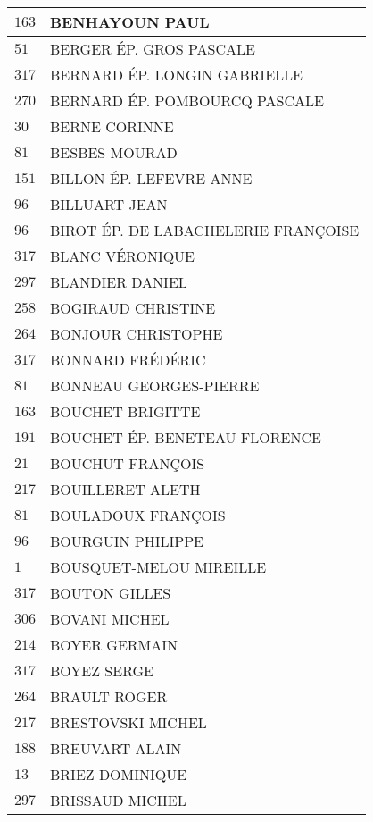\begin{xltabular}{\linewidth}{|l|X|}
    \hline
    $163$ & BENHAYOUN PAUL \\
    \hline
    $51$ & BERGER ÉP. GROS PASCALE \\
    \hline
    $317$ & BERNARD ÉP. LONGIN GABRIELLE \\
    \hline
    $270$ & BERNARD ÉP. POMBOURCQ PASCALE \\
    \hline
    $30$ & BERNE CORINNE \\
    \hline
    $81$ & BESBES MOURAD \\
    \hline
    $151$ & BILLON ÉP. LEFEVRE ANNE \\
    \hline
    $96$ & BILLUART JEAN \\
    \hline
    $96$ & BIROT ÉP. DE LABACHELERIE FRANÇOISE \\
    \hline
    $317$ & BLANC VÉRONIQUE \\
    \hline
    $297$ & BLANDIER DANIEL \\
    \hline
    $258$ & BOGIRAUD CHRISTINE \\
    \hline
    $264$ & BONJOUR CHRISTOPHE \\
    \hline
    $317$ & BONNARD FRÉDÉRIC \\
    \hline
    $81$ & BONNEAU GEORGES-PIERRE \\
    \hline
    $163$ & BOUCHET BRIGITTE \\
    \hline
    $191$ & BOUCHET ÉP. BENETEAU FLORENCE \\
    \hline
    $21$ & BOUCHUT FRANÇOIS \\
    \hline
    $217$ & BOUILLERET ALETH \\
    \hline
    $81$ & BOULADOUX FRANÇOIS \\
    \hline
    $96$ & BOURGUIN PHILIPPE \\
    \hline
    $1$ & BOUSQUET-MELOU MIREILLE \\
    \hline
    $317$ & BOUTON GILLES \\
    \hline
    $306$ & BOVANI MICHEL \\
    \hline
    $214$ & BOYER GERMAIN \\
    \hline
    $317$ & BOYEZ SERGE \\
    \hline
    $264$ & BRAULT ROGER \\
    \hline
    $217$ & BRESTOVSKI MICHEL \\
    \hline
    $188$ & BREUVART ALAIN \\
    \hline
    $13$ & BRIEZ DOMINIQUE \\
    \hline
    $297$ & BRISSAUD MICHEL \\

\end{xltabular}
